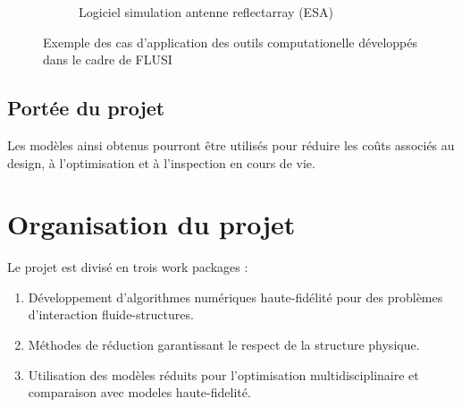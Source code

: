 \documentclass[french]{article}
\begin{document}
\begin{figure}
\begin{subfigure}[t]{0.35\textwidth}
		\caption{Logiciel simulation antenne reflectarray (ESA)}
		\label{fig:array}
	\end{subfigure}%
	\caption[]{Exemple des cas d'application des outils computationelle développés dans le cadre de FLUSI \footnotemark}%
	\label{fig:applications}%
\end{figure}





\subsection{Portée du projet}

Les modèles ainsi obtenus pourront être utilisés pour réduire les  co\^{u}ts associés au design, \`a l'optimisation et \`a l'inspection en cours de vie.

\section{Organisation du projet}
Le projet est divisé en trois work packages :

\begin{enumerate}
	\item Développement d'algorithmes numériques haute-fidélité pour des problèmes d'interaction fluide-structures.
	\item Méthodes de réduction garantissant le respect de la structure physique. 
	\item Utilisation des modèles réduits pour l'optimisation multidisciplinaire et comparaison avec modeles haute-fidelité.
\end{enumerate}
\end{document}
